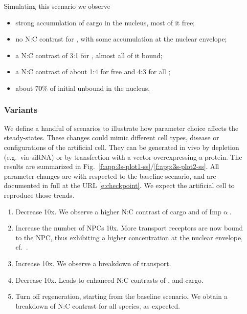 \documentclass[12pt,notitlepage]{article}
\begin{document}
\begin{itemize}

\end{itemize}

  
Simulating this scenario
we observe
\begin{itemize}
\item 
	strong accumulation of  cargo
	in the nucleus,
	most of it free;
\item
	no N:C contrast for ,
	with some accumulation at the nuclear envelope;
\item
	a N:C contrast of 3:1 for ,
	almost all of it bound;
\item
	a N:C contrast of about 1:4 for free 
	and 4:3 for all ;
\item
	about 70\% of initial 
	unbound in the nucleus.
\end{itemize}



%

\subsubsection*{Variants}

We define a handful of scenarios 
to illustrate how 
parameter choice affects 
the steady-states.
%
These changes could mimic
different cell types, disease
or
configurations of the artificial cell.
%
They can be generated in vivo
by depletion (e.g.~via siRNA)
or 
by transfection with a vector overexpressing a protein.
%
%
The results are summarized in Fig.~\ref{f:app:3s-plot1-ss}/\ref{f:app:3s-plot2-ss}.
%
%
All parameter changes are
with respected 
to the baseline scenario,
and are documented in full at the URL \eqref{e:checkpoint}.
%
%
%
We expect the artificial cell 
to reproduce those trends.



\begin{enumerate}
\item 
	Decrease  10x.
	We observe a higher N:C contrast of cargo and of Imp$\upalpha$.
	
\item
	Increase the number of NPCs 10x.
	More transport receptors are now bound to the NPC,
	thus exhibiting a higher concentration
 	at the nuclear envelope, cf.~\cite{KalitaETAL2022}.
	
\item
	Increase  10x.
	We observe a breakdown of transport.

\item
	Decrease  10x.
	Leads to enhanced N:C contrasts
	of ,  and  cargo.
	
\item
	Turn off  regeneration,
	starting from the baseline scenario.
	We obtain a breakdown of N:C contrast
	for all species,
	as expected.
\end{enumerate}
\end{document}
